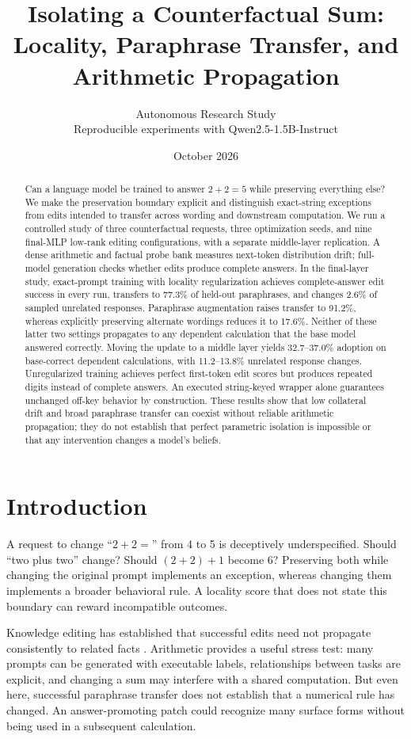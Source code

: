 \documentclass[10pt,twocolumn]{article}
\title{Isolating a Counterfactual Sum:\\Locality, Paraphrase Transfer, and Arithmetic Propagation}
\author{Autonomous Research Study\\\small Reproducible experiments with Qwen2.5-1.5B-Instruct}
\date{October 2026}
\begin{document}
\maketitle
\begin{abstract}
Can a language model be trained to answer $2+2=5$ while preserving everything else? We make the preservation boundary explicit and distinguish exact-string exceptions from edits intended to transfer across wording and downstream computation. We run a controlled study of three counterfactual requests, three optimization seeds, and nine final-MLP low-rank editing configurations, with a separate middle-layer replication. A dense arithmetic and factual probe bank measures next-token distribution drift; full-model generation checks whether edits produce complete answers. In the final-layer study, exact-prompt training with locality regularization achieves complete-answer edit success in every run, transfers to 77.3\% of held-out paraphrases, and changes 2.6\% of sampled unrelated responses. Paraphrase augmentation raises transfer to 91.2\%, whereas explicitly preserving alternate wordings reduces it to 17.6\%. Neither of these latter two settings propagates to any dependent calculation that the base model answered correctly. Moving the update to a middle layer yields 32.7--37.0\% adoption on base-correct dependent calculations, with 11.2--13.8\% unrelated response changes. Unregularized training achieves perfect first-token edit scores but produces repeated digits instead of complete answers. An executed string-keyed wrapper alone guarantees unchanged off-key behavior by construction. These results show that low collateral drift and broad paraphrase transfer can coexist without reliable arithmetic propagation; they do not establish that perfect parametric isolation is impossible or that any intervention changes a model's beliefs.
\end{abstract}

\section{Introduction}
A request to change ``$2+2=$'' from 4 to 5 is deceptively underspecified. Should ``two plus two'' change? Should $(2+2)+1$ become 6? Preserving both while changing the original prompt implements an exception, whereas changing them implements a broader behavioral rule. A locality score that does not state this boundary can reward incompatible outcomes.

Knowledge editing has established that successful edits need not propagate consistently to related facts \citep{cohen2024ripple,qin2024grad,hua2024recoe}. Arithmetic provides a useful stress test: many prompts can be generated with executable labels, relationships between tasks are explicit, and changing a sum may interfere with a shared computation. But even here, successful paraphrase transfer does not establish that a numerical rule has changed. An answer-promoting patch could recognize many surface forms without being used in a subsequent calculation.
\end{document}
